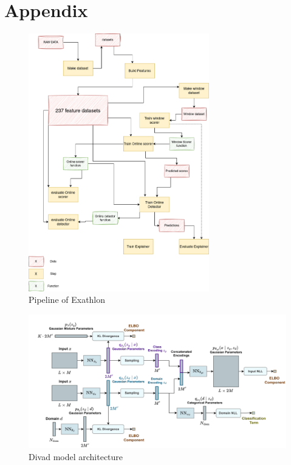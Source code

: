\documentclass[oneside, a4paper, onecolumn, 11pt]{article}
\begin{document}
\newpage



\newpage
\appendix

\section{Appendix}
\label{sec:appendix}


\begin{figure}[h]
    \centering
    \includegraphics[width=0.7\textwidth]{images/pipeline.drawio.png} %
    \caption{Pipeline of Exathlon}
    \label{fig:pipeline}
\end{figure}
\begin{figure}[h]
  \centering
  \includegraphics[width=1\textwidth]{images/divad model.png} %
  \caption{Divad model architecture}
  \label{fig:divad_arch}
\end{figure}
\end{document}

